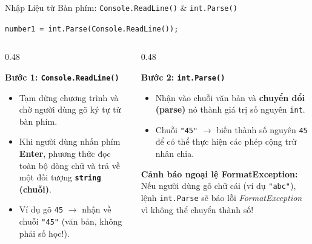 \documentclass[aspectratio=169, 10pt]{beamer}
\begin{document}
\begin{frame}[fragile]{Nhập Liệu từ Bàn phím: \texttt{Console.ReadLine()} \& \texttt{int.Parse()}}
  \begin{tcolorbox}[colback=CodeBg,colframe=UniBlue,title=\textbf{Cú pháp nhập và chuyển đổi kiểu dữ liệu},fonttitle=\small\bfseries]
    \centering
    \Large \texttt{number1 = int.Parse(Console.ReadLine());}
  \end{tcolorbox}

  \begin{columns}[T]
    \begin{column}{0.48\textwidth}
      \begin{block}{\textbf{Bước 1: \texttt{Console.ReadLine()}}}
        \begin{itemize}\small
          \item Tạm dừng chương trình và chờ người dùng gõ ký tự từ bàn phím.
          \item Khi người dùng nhấn phím \textbf{Enter}, phương thức đọc toàn bộ dòng chữ và trả về một đối tượng \textbf{\texttt{string} (chuỗi)}.
          \item Ví dụ gõ \texttt{45} $\to$ nhận về chuỗi \texttt{"45"} (văn bản, không phải số học!).
        \end{itemize}
      \end{block}
    \end{column}

    \begin{column}{0.48\textwidth}
      \begin{block}{\textbf{Bước 2: \texttt{int.Parse()}}}
        \begin{itemize}\small
          \item Nhận vào chuỗi văn bản và \textbf{chuyển đổi (parse)} nó thành giá trị số nguyên \texttt{int}.
          \item Chuỗi \texttt{"45"} $\to$ biến thành số nguyên \texttt{45} để có thể thực hiện các phép cộng trừ nhân chia.
        \end{itemize}
      \end{block}

      \begin{alertblock}{\textbf{Cảnh báo ngoại lệ FormatException:}}
        Nếu người dùng gõ chữ cái (ví dụ \texttt{"abc"}), lệnh \texttt{int.Parse} sẽ báo lỗi \textit{FormatException} vì không thể chuyển thành số!
      \end{alertblock}
    \end{column}
  \end{columns}
\end{frame}
\end{document}
